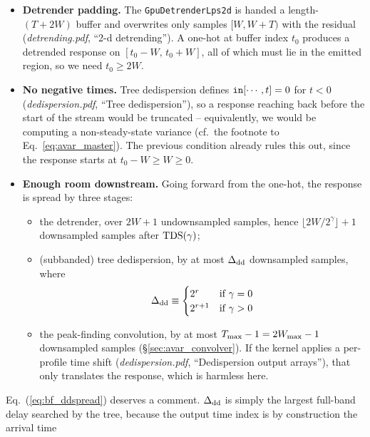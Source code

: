 \documentclass{article}
\numberwithin{equation}{section}   %
\def\TDS{{\rm TDS}}
\newcommand{\ddnotes}[1]{{\em dedispersion.pdf}, ``#1''}
\newcommand{\dtnotes}[1]{{\em detrending.pdf}, ``#1''}
\begin{document}
\begin{itemize}

\item {\bf Detrender padding.} The {\tt GpuDetrenderLps2d} is handed a length-$(T+2W)$ buffer and
overwrites only samples $[W, W+T)$ with the residual (\dtnotes{2-d detrending}). A one-hot at buffer
index $t_0$ produces a detrended response on $[t_0-W,\, t_0+W]$, all of which must lie in the
emitted region, so we need $t_0 \ge 2W$.

\item {\bf No negative times.} Tree dedispersion defines ${\tt in}[\cdots,t] = 0$ for $t<0$
(\ddnotes{Tree dedispersion}), so a response reaching back before the start of the stream would
be truncated -- equivalently, we would be computing a non-steady-state variance
(cf.\ the footnote to Eq.\ \ref{eq:avar_master}). The previous condition already rules this out,
since the response starts at $t_0 - W \ge W \ge 0$.

\item {\bf Enough room downstream.} Going forward from the one-hot, the response is spread by
three stages:
\begin{itemize}
\item the detrender, over $2W+1$ undownsampled samples, hence
$\lfloor 2W/2^\gamma \rfloor + 1$ downsampled samples after $\TDS(\gamma)$;
\item (subbanded) tree dedispersion, by at most $\Delta_{\rm dd}$ downsampled samples, where
\begin{equation}
\Delta_{\rm dd} \equiv \begin{cases} 2^r & \mbox{if } \gamma = 0 \\
                                     2^{r+1} & \mbox{if } \gamma > 0 \end{cases}
\label{eq:bf_ddspread}
\end{equation}
\item the peak-finding convolution, by at most $T_{\rm max} - 1 = 2W_{\rm max}-1$ downsampled
samples (\S\ref{sec:avar_convolver}). If the kernel applies a per-profile time shift
(\ddnotes{Dedispersion output arrays}), that only translates the response, which is harmless
here.
\end{itemize}
\end{itemize}
\par\noindent
Eq.\ (\ref{eq:bf_ddspread}) deserves a comment. $\Delta_{\rm dd}$ is simply the largest full-band
delay searched by the tree, because the output time index is by construction the arrival time
\end{document}
